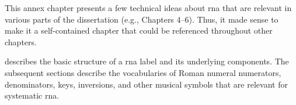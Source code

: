 
This annex chapter presents a few technical ideas about
\gls{rna} that are relevant in various parts of the
dissertation (e.g., Chapters 4--6). Thus, it made sense to
make it a self-contained chapter that could be referenced
throughout other chapters.

 describes
the basic structure of a \gls{rna} label and its underlying
components. The subsequent sections describe the
vocabularies of Roman numeral numerators, denominators,
keys, inversions, and other musical symbols that are
relevant for systematic \gls{rna}.
